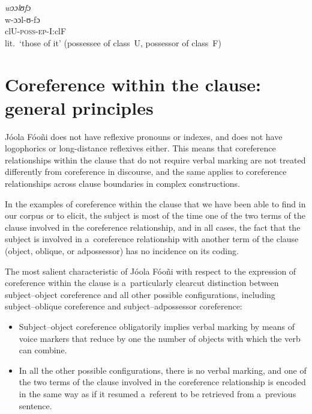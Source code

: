 \documentclass[output=paper]{langscibook}
\begin{document}
    \ex\label{ex:Creissels:9b}
    
      
        \textit{wɔɔlʊfɔ}\\
        \gll w-ɔɔl-ʊ-fɔ\\
        clU-\textsc{poss-ep}-I:clF\\
        \glt lit.\ `those of it' (possessee of class~U, possessor of class~F)
  

  \z
\z


\section{Coreference within the clause: general principles}%
\label{sec:Creissels:coref-within-clause}

Jóola Fóoñi does not have reflexive pronouns or indexes, and does not have
logophorics or long-distance reflexives either.  This means that coreference
relationships within the clause that do not require verbal marking are not
treated differently from coreference in discourse, and the same applies to
coreference relationships across clause boundaries in complex constructions.

In the examples of coreference within the clause that we have been able to find
in our corpus or to elicit, the subject is most of the time one of the two
terms of the clause involved in the coreference relationship, and in all cases,
the fact that the subject is involved in a~coreference relationship with
another term of the clause (object, oblique, or adpossessor) has no incidence
on its coding.

The most salient characteristic of Jóola Fóoñi with respect to the expression
of coreference within the clause is a~particularly clearcut distinction between
subject--object coreference and all other possible configurations, including
sub\-ject--ob\-lique coreference and subject--adpossessor coreference:

\begin{itemize}
\item Subject--object coreference obligatorily implies verbal marking by means
  of voice markers that reduce by one the number of objects with which the verb
  can combine.
\item In all the other possible configurations, there is no verbal marking, and
  one of the two terms of the clause involved in the coreference relationship
  is encoded in the same way as if it resumed a~referent to be retrieved from
  a~previous sentence.
\end{itemize}
\end{document}
